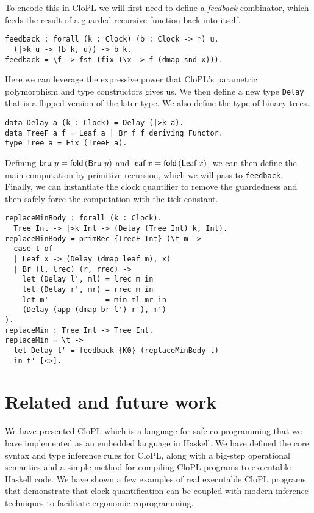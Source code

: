 \documentclass[sigplan,9pt,review]{acmart}\settopmatter{printfolios=true,printccs=false,printacmref=false}
\newcommand{\clopl}{\textsf{CloPL}\xspace}
\newcommand{\code}[1]{\texttt{#1}}
\begin{document}
To encode this in \clopl we will first need to define a \emph{feedback} combinator, which
feeds the result of a guarded recursive function back into itself.
\begin{verbatim}
feedback : forall (k : Clock) (b : Clock -> *) u.
  (|>k u -> (b k, u)) -> b k.
feedback = \f -> fst (fix (\x -> f (dmap snd x))).
\end{verbatim}
Here we can leverage the expressive power that \clopl's parametric polymorphism and type constructors
gives us.
We then define a new type \code{Delay} that is a flipped version of the later type. We
also define the type of binary trees.
\begin{verbatim}
data Delay a (k : Clock) = Delay (|>k a).
data TreeF a f = Leaf a | Br f f deriving Functor.
type Tree a = Fix (TreeF a).
\end{verbatim}

Defining $\mathsf{br}\, x\, y = \mathsf{fold}\, (\mathsf{Br}\, x\, y)$ and
$\mathsf{leaf}\, x = \mathsf{fold}\, (\mathsf{Leaf}\, x)$, we can then define the main computation by primitive recursion, which we will pass to
\code{feedback}.
Finally, we can instantiate the clock quantifier to remove
the guardedness and then safely force the computation with the tick constant.

\begin{verbatim}
replaceMinBody : forall (k : Clock).
  Tree Int -> |>k Int -> (Delay (Tree Int) k, Int).
replaceMinBody = primRec {TreeF Int} (\t m ->
  case t of
  | Leaf x -> (Delay (dmap leaf m), x)
  | Br (l, lrec) (r, rrec) ->
    let (Delay l', ml) = lrec m in
    let (Delay r', mr) = rrec m in
    let m'             = min ml mr in
    (Delay (app (dmap br l') r'), m')
).
replaceMin : Tree Int -> Tree Int.
replaceMin = \t ->
  let Delay t' = feedback {K0} (replaceMinBody t)
  in t' [<>].
\end{verbatim}


\section{Related and future work}
We have presented \clopl which is a language for safe co-programming that we
have implemented as an embedded language in Haskell. We have defined the
core syntax and type inference rules for \clopl, along with a big-step operational
semantics and a simple method for compiling \clopl programs to executable Haskell
code. We have shown a few examples of real executable \clopl programs that demonstrate
that clock quantification can be coupled with modern inference techniques to facilitate
ergonomic coprogramming.
\end{document}
